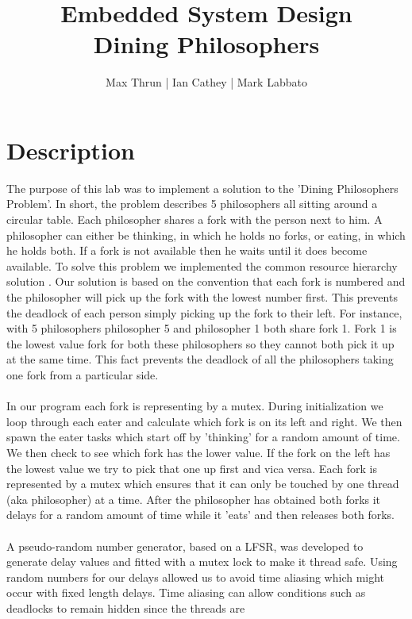 \documentclass[12pt]{article}
\title{Embedded System Design \\ Dining Philosophers}
\author{ Max Thrun | Ian Cathey | Mark Labbato }
\begin{document}
\maketitle

\section*{Description}

The purpose of this lab was to implement a solution to the
'Dining Philosophers Problem'. In short, the problem describes
5 philosophers all sitting around a circular table. Each philosopher
shares a fork with the person next to him. A philosopher can either
be thinking, in which he holds no forks, or eating, in which he holds
both. If a fork is not available then he waits until it
does become available. To solve this problem we implemented the common
resource hierarchy solution \cite{sol}. Our solution is based on the
convention that each fork is numbered and the philosopher will pick up
the fork with the lowest number first. This prevents the deadlock of each
person simply picking up the fork to their left. For instance, with 5
philosophers philosopher 5 and philosopher 1 both share fork 1. Fork 1
is the lowest value fork for both these philosophers so they cannot both
pick it up at the same time. This fact prevents the deadlock of all the
philosophers taking one fork from a particular side.
\\\\
In our program each fork is representing by a mutex. During initialization 
we loop through each eater and calculate which fork is on its left and right. 
We then spawn the eater tasks which start off by 'thinking' for a random amount of
time. We then check to see which fork has the lower value. If the fork on the
left has the lowest value we try to pick that one up first and vica versa.
Each fork is represented by a mutex which ensures that it can only be touched
by one thread (aka philosopher) at a time. After the philosopher has obtained both
forks it delays for a random amount of time while it 'eats' and then releases
both forks.
\\\\
A pseudo-random number generator, based on a LFSR, was developed to generate delay values
and fitted with a mutex lock to make it thread safe. Using random numbers for our delays 
allowed us to avoid time aliasing which might occur with fixed length delays. Time aliasing 
can allow conditions such as deadlocks to remain hidden since the threads are
\end{document}
